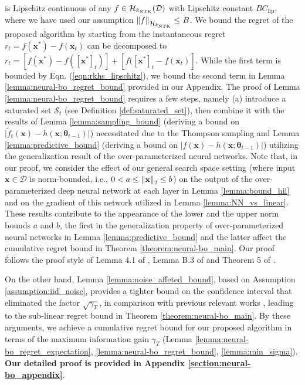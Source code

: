is Lipschitz continuous of any $f \in \mathcal{H}_{k_\textup{NTK}}(\mathcal{D})$ with Lipschitz constant $B C_{\text{lip}}$, where we have used our assumption $\norm{f}_{\mathcal{H}_{k_\textup{NTK}}} \leq B$. We bound the regret of the proposed algorithm by starting from the instantaneous regret $r_t = f(\mathbf{x}^*) - f(\mathbf{x}_t)$ can be decomposed to $r_t = [f(\mathbf{x}^*) - f([\mathbf{x}^*]_t)] + [f([\mathbf{x}^*]_t - f(\mathbf{x}_t)]$. While the first term is bounded by Eqn. (\ref{eqn:rkhs_lipschitz}),  we bound the second term in Lemma \ref{lemma:neural-bo_regret_bound} provided in our Appendix. The proof of Lemma \ref{lemma:neural-bo_regret_bound} requires a few steps, namely (a) introduce a saturated set $\mathcal S_t$ (see Definition \ref{def:saturated_set}), then combine it with the results of Lemma \ref{lemma:sampling_bound} (deriving a bound on $\lvert \widetilde{f}_t(\mathbf{x}) - h(\mathbf{x}; \boldsymbol{\theta}_{t-1}) \rvert$) necessitated due to the Thompson sampling and Lemma \ref{lemma:predictive_bound} (deriving a bound on $\lvert f(\mathbf{x}) - h(\mathbf{x}; \boldsymbol{\theta}_{t-1}) \rvert$) utilizing the generalization result of the over-parameterized neural networks. Note that, in our proof, we consider the effect of our general search space setting (where input $\mathbf{x} \in \mathcal{D}$ is norm-bounded, i.e.,  $0 < a \le \norm{\mathbf{x}}_2 \le b$) on the output of the over-parameterized deep neural network at each layer in Lemma \ref{lemma:bound_hil} and on the gradient of this network utilized in Lemma \ref{lemma:NN_vs_linear}. These results contribute to the appearance of the lower and the upper norm bounds $a$ and $b$, the first in the generalization property of over-parameterized neural networks in Lemma \ref{lemma:predictive_bound} and the latter affect the cumulative regret bound in Theorem \ref{theorem:neural-bo_main}. Our proof follows the proof style of Lemma 4.1 of \citet{cao2019generalization}, Lemma B.3 of \citet{cao2019generalization} and Theorem 5 
of \citet{allen2019convergence}. 

On the other hand, Lemma \ref{lemma:noise_affeted_bound}, based on Assumption \ref{assumption:iid_noise}, provides a tighter bound on the confidence interval that eliminated the factor $\sqrt{\gamma_T}$, in comparison with previous relevant works \citet{chowdhury2017kernelized, zhou2020neural}, leading to the sub-linear regret bound in Theorem \ref{theorem:neural-bo_main}.   
By these arguments, we achieve a cumulative regret bound for our proposed algorithm in terms of the maximum information gain $\gamma_T$ (Lemma \ref{lemma:neural-bo_regret_expectation}, \ref{lemma:neural-bo_regret_bound}, \ref{lemma:min_sigma}). \textbf{Our detailed proof is provided in Appendix \ref{section:neural-bo_appendix}}.

